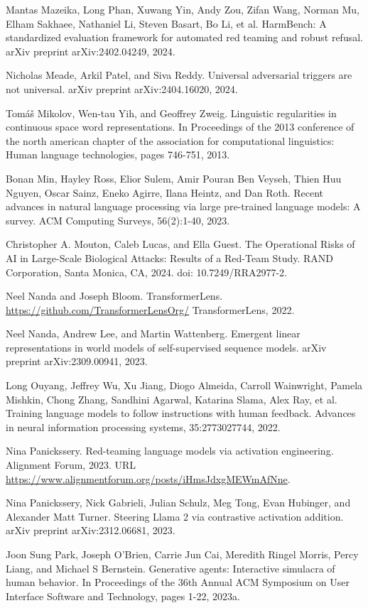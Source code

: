 \documentclass[10pt]{article}
\begin{document}
Mantas Mazeika, Long Phan, Xuwang Yin, Andy Zou, Zifan Wang, Norman Mu, Elham Sakhaee, Nathaniel Li, Steven Basart, Bo Li, et al. HarmBench: A standardized evaluation framework for automated red teaming and robust refusal. arXiv preprint arXiv:2402.04249, 2024.

Nicholas Meade, Arkil Patel, and Siva Reddy. Universal adversarial triggers are not universal. arXiv preprint arXiv:2404.16020, 2024.

Tomáš Mikolov, Wen-tau Yih, and Geoffrey Zweig. Linguistic regularities in continuous space word representations. In Proceedings of the 2013 conference of the north american chapter of the association for computational linguistics: Human language technologies, pages 746-751, 2013.

Bonan Min, Hayley Ross, Elior Sulem, Amir Pouran Ben Veyseh, Thien Huu Nguyen, Oscar Sainz, Eneko Agirre, Ilana Heintz, and Dan Roth. Recent advances in natural language processing via large pre-trained language models: A survey. ACM Computing Surveys, 56(2):1-40, 2023.

Christopher A. Mouton, Caleb Lucas, and Ella Guest. The Operational Risks of AI in Large-Scale Biological Attacks: Results of a Red-Team Study. RAND Corporation, Santa Monica, CA, 2024. doi: 10.7249/RRA2977-2.

Neel Nanda and Joseph Bloom. TransformerLens. \href{https://github.com/TransformerLensOrg/}{https://github.com/TransformerLensOrg/} TransformerLens, 2022.

Neel Nanda, Andrew Lee, and Martin Wattenberg. Emergent linear representations in world models of self-supervised sequence models. arXiv preprint arXiv:2309.00941, 2023.

Long Ouyang, Jeffrey Wu, Xu Jiang, Diogo Almeida, Carroll Wainwright, Pamela Mishkin, Chong Zhang, Sandhini Agarwal, Katarina Slama, Alex Ray, et al. Training language models to follow instructions with human feedback. Advances in neural information processing systems, 35:2773027744, 2022.

Nina Panickssery. Red-teaming language models via activation engineering. Alignment Forum, 2023. URL \href{https://www.alignmentforum.org/posts/iHmsJdxgMEWmAfNne}{https://www.alignmentforum.org/posts/iHmsJdxgMEWmAfNne}.

Nina Panickssery, Nick Gabrieli, Julian Schulz, Meg Tong, Evan Hubinger, and Alexander Matt Turner. Steering Llama 2 via contrastive activation addition. arXiv preprint arXiv:2312.06681, 2023.

Joon Sung Park, Joseph O'Brien, Carrie Jun Cai, Meredith Ringel Morris, Percy Liang, and Michael S Bernstein. Generative agents: Interactive simulacra of human behavior. In Proceedings of the 36th Annual ACM Symposium on User Interface Software and Technology, pages 1-22, 2023a.
\end{document}
